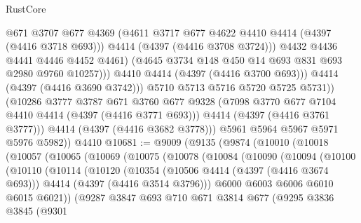 \begin{lexlean}{RustCore}
\begin{coremodule}
                          @671
                          @3707
                          @677
                          @4369
                          (@4611 @3717 @677 @4622 @4410 @4414 (@4397 (@4416 @3718 @693)))
                          @4414
                          (@4397 (@4416 @3708 @3724)))
                        @4432
                        @4436
                        @4441
                        @4446
                        @4452
                        @4461)
                      (@4645 @3734 @148 @450 @14 @693 @831 @693 @2980 @9760 @10257)))
                  @4410
                  @4414
                  (@4397 (@4416 @3700 @693)))
                @4414
                (@4397 (@4416 @3690 @3742)))
              @5710
              @5713
              @5716
              @5720
              @5725
              @5731))
          (@10286
            @3777
            @3787
            @671
            @3760
            @677
            @9328
            (@7098 @3770 @677 @7104 @4410 @4414 (@4397 (@4416 @3771 @693)))
            @4414
            (@4397 (@4416 @3761 @3777)))
          @4414
          (@4397 (@4416 @3682 @3778)))
        @5961
        @5964
        @5967
        @5971
        @5976
        @5982))
    @4410
@10681 := @9009
    (@9135
      (@9874
        (@10010
          (@10018
            (@10057
              (@10065
                (@10069
                  (@10075
                    (@10078
                      (@10084
                        (@10090
                          (@10094
                            (@10100
                              (@10110
                                (@10114
                                  (@10120
                                    (@10354
                                      (@10506 @4414 (@4397 (@4416 @3674 @693)))
                                      @4414
                                      (@4397 (@4416 @3514 @3796)))
                                    @6000
                                    @6003
                                    @6006
                                    @6010
                                    @6015
                                    @6021))
                                (@9287
                                  @3847
                                  @693
                                  @710
                                  @671
                                  @3814
                                  @677
                                  (@9295
                                    @3836
                                    @3845
                                    (@9301

\end{coremodule}
\end{lexlean}
